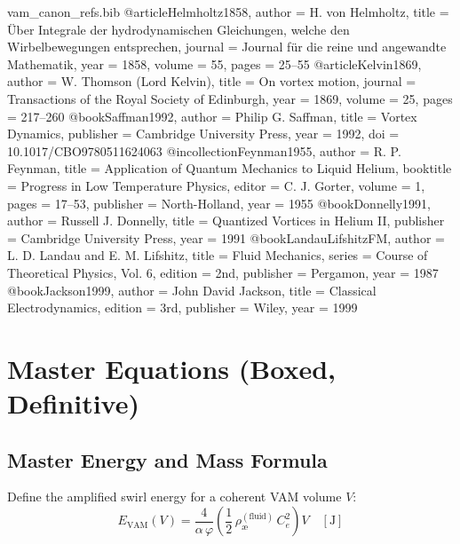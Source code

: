 \documentclass[11pt, a4paper]{article}
\begin{document}
\begin{filecontents*}{vam_canon_refs.bib}
    @article{Helmholtz1858,
    author  = {H. von Helmholtz},
    title   = {\"Uber Integrale der hydrodynamischen Gleichungen, welche den Wirbelbewegungen entsprechen},
    journal = {Journal f{\"u}r die reine und angewandte Mathematik},
    year    = {1858},
    volume  = {55},
    pages   = {25--55}
    }
    @article{Kelvin1869,
    author  = {W. Thomson (Lord Kelvin)},
    title   = {On vortex motion},
    journal = {Transactions of the Royal Society of Edinburgh},
    year    = {1869},
    volume  = {25},
    pages   = {217--260}
    }
    @book{Saffman1992,
    author    = {Philip G. Saffman},
    title     = {Vortex Dynamics},
    publisher = {Cambridge University Press},
    year      = {1992},
    doi       = {10.1017/CBO9780511624063}
    }
    @incollection{Feynman1955,
    author    = {R. P. Feynman},
    title     = {Application of Quantum Mechanics to Liquid Helium},
    booktitle = {Progress in Low Temperature Physics},
    editor    = {C. J. Gorter},
    volume    = {1},
    pages     = {17--53},
    publisher = {North-Holland},
    year      = {1955}
    }
    @book{Donnelly1991,
    author    = {Russell J. Donnelly},
    title     = {Quantized Vortices in Helium II},
    publisher = {Cambridge University Press},
    year      = {1991}
    }
    @book{LandauLifshitzFM,
    author    = {L. D. Landau and E. M. Lifshitz},
    title     = {Fluid Mechanics},
    series    = {Course of Theoretical Physics, Vol. 6},
    edition   = {2nd},
    publisher = {Pergamon},
    year      = {1987}
    }
    @book{Jackson1999,
    author    = {John David Jackson},
    title     = {Classical Electrodynamics},
    edition   = {3rd},
    publisher = {Wiley},
    year      = {1999}
    }
\end{filecontents*}


\section{Master Equations (Boxed, Definitive)}

\subsection{Master Energy and Mass Formula}

Define the amplified swirl energy for a coherent VAM volume $V$:
\begin{equation}
E_{\text{VAM}}(V) = \frac{4}{\alpha\,\varphi} \left( \frac{1}{2}\,\rho_{\text{\ae}}^{(\text{fluid})}\,C_e^{2} \right) V
\quad [\text{J}]
\end{equation}
\end{document}
